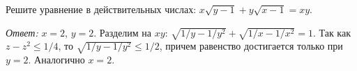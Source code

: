 Решите уравнение в действительных числах:
$x \sqrt{y - 1} + y \sqrt{x - 1} = x y$.

\solution
\emph{Ответ:} $x = 2$, $y = 2$.
Разделим на $x y$:
$\sqrt{1 / y - 1 / y^2} + \sqrt{1 / x - 1 / x^2} = 1$.
Так как $z - z^2 \leq 1 / 4$, то $\sqrt{1 / y - 1 / y^2} \leq 1 / 2$, причем
равенство достигается только при $y = 2$.
Аналогично $x = 2$.

